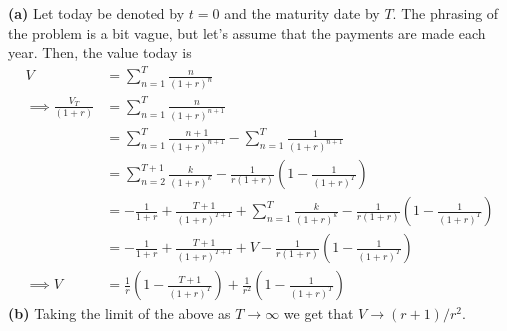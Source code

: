 \documentclass[11pt]{article}
\renewcommand\part[1]{\vspace{.10in}\textbf{(#1)}}
\begin{document}
\part{a} Let today be denoted by $t=0$ and the maturity date by $T$. The phrasing of the problem is a bit vague, but let's assume that the payments are made each year. Then, the value today is
\begin{align}
    V &= \sum_{n=1}^{T} \frac{n}{(1 + r)^n} \nonumber\\
    \implies \frac{V_T}{(1 + r)} &= \sum_{n=1}^{T} \frac{n}{(1 + r)^{n+1}} \nonumber\\
                                 &= \sum_{n=1}^{T} \frac{n+1}{(1 + r)^{n+1}} - \sum_{n=1}^{T} \frac{1}{(1 + r)^{n+1}} \nonumber\\
                                 &= \sum_{n=2}^{T + 1} \frac{k}{(1 + r)^{k}} -\frac{1}{r(1 + r)}\left(1 - \frac{1}{(1 + r)^T}\right) \nonumber \\
                                 &= -\frac{1}{1 + r} + \frac{T + 1}{(1 + r)^{T+1}} + \sum_{n=1}^{T} \frac{k}{(1 + r)^{k}} -\frac{1}{r(1 + r)}\left(1 - \frac{1}{(1 + r)^T}\right) \nonumber\\
                                 &= -\frac{1}{1 + r} + \frac{T + 1}{(1 + r)^{T+1}} + V - \frac{1}{r(1 + r)}\left(1 - \frac{1}{(1 + r)^T}\right) \nonumber \\
   \implies V &= \frac{1}{r}\left(1 - \frac{T + 1}{(1 + r)^T}\right) + \frac{1}{r^2}\left(1 - \frac{1}{(1 + r)^T}\right)
\end{align}
\part{b} Taking the limit of the above as $T\to\infty$ we get that $V\to (r + 1)/r^2$.
\end{document}
